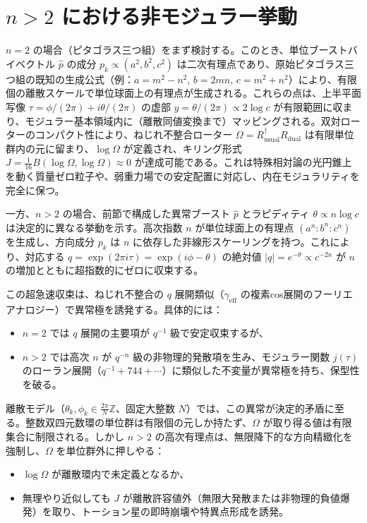 \documentclass[a4paper]{article}
\begin{document}
\section{$n > 2$ における非モジュラー挙動}

$n=2$ の場合（ピタゴラス三つ組）をまず検討する。このとき、単位ブーストバイベクトル $\hat{p}$ の成分 $p_k \propto (a^2, b^2, c^2)$ は二次有理点であり、原始ピタゴラス三つ組の既知の生成公式（例：$a = m^2 - n^2$, $b = 2mn$, $c = m^2 + n^2$）により、有限個の離散スケールで単位球面上の有理点が生成される。これらの点は、上半平面写像 $\tau = \phi/(2\pi) + i \theta/(2\pi)$ の虚部 $y = \theta/(2\pi) \propto 2 \log c$ が有限範囲に収まり、モジュラー基本領域内に（離散同値変換まで）マッピングされる。双対ローターのコンパクト性により、ねじれ不整合ローター $\Omega = R_\text{usual}^\dagger R_\text{dual}$ は有限単位群内の元に留まり、$\log \Omega$ が定義され、キリング形式 $J = \frac{1}{16} B(\log \Omega, \log \Omega) \approx 0$ が達成可能である。これは特殊相対論の光円錐上を動く質量ゼロ粒子や、弱重力場での安定配置に対応し、内在モジュラリティを完全に保つ。

一方、$n > 2$ の場合、前節で構成した異常ブースト $\hat{p}$ とラピディティ $\theta \propto n \log c$ は決定的に異なる挙動を示す。高次指数 $n$ が単位球面上の有理点 $(a^n : b^n : c^n)$ を生成し、方向成分 $p_k$ は $n$ に依存した非線形スケーリングを持つ。これにより、対応する $q = \exp(2\pi i \tau) = \exp(i \phi - \theta)$ の絶対値 $|q| = e^{-\theta} \propto c^{-2n}$ が $n$ の増加とともに超指数的にゼロに収束する。

この超急速収束は、ねじれ不整合の $q$ 展開類似（$\gamma_\text{eff}$ の複素cos展開のフーリエアナロジー）で異常極を誘発する。具体的には：
\begin{itemize}
  \item $n=2$ では $q$ 展開の主要項が $q^{-1}$ 級で安定収束するが、
  \item $n > 2$ では高次 $n$ が $q^{-n}$ 級の非物理的発散項を生み、モジュラー関数 $j(\tau)$ のローラン展開（$q^{-1} + 744 + \cdots$）に類似した不変量が異常極を持ち、保型性を破る。
\end{itemize}

離散モデル（$\theta_k, \phi_k \in \frac{2\pi}{N} \mathbb{Z}$、固定大整数 $N$）では、この異常が決定的矛盾に至る。整数双四元数環の単位群は有限個の元しか持たず、$\Omega$ が取り得る値は有限集合に制限される。しかし $n > 2$ の高次有理点は、無限降下的な方向精緻化を強制し、$\Omega$ を単位群外に押しやる：
\begin{itemize}
  \item $\log \Omega$ が離散環内で未定義となるか、
  \item 無理やり近似しても $J$ が離散許容値外（無限大発散または非物理的負値爆発）を取り、トーション星の即時崩壊や特異点形成を誘発。
\end{itemize}
\end{document}
